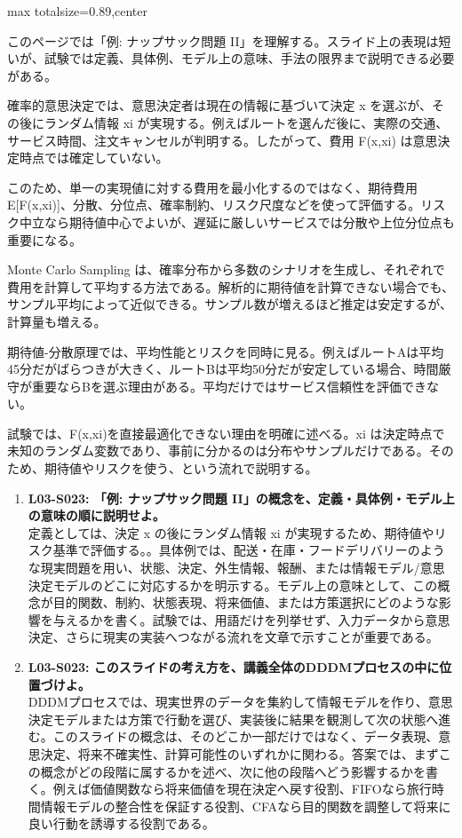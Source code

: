 \begin{minipage}[t]{0.58\textwidth}
\begin{adjustbox}{max totalsize={\textwidth}{0.89\textheight},center}
\begin{minipage}{\textwidth}\scriptsize
{}このページでは「例: ナップサック問題 II」を理解する。スライド上の表現は短いが、試験では定義、具体例、モデル上の意味、手法の限界まで説明できる必要がある。\par
確率的意思決定では、意思決定者は現在の情報に基づいて決定 x を選ぶが、その後にランダム情報 xi が実現する。例えばルートを選んだ後に、実際の交通、サービス時間、注文キャンセルが判明する。したがって、費用 F(x,xi) は意思決定時点では確定していない。\par
このため、単一の実現値に対する費用を最小化するのではなく、期待費用 E[F(x,xi)]、分散、分位点、確率制約、リスク尺度などを使って評価する。リスク中立なら期待値中心でよいが、遅延に厳しいサービスでは分散や上位分位点も重要になる。\par
Monte Carlo Sampling は、確率分布から多数のシナリオを生成し、それぞれで費用を計算して平均する方法である。解析的に期待値を計算できない場合でも、サンプル平均によって近似できる。サンプル数が増えるほど推定は安定するが、計算量も増える。\par
期待値-分散原理では、平均性能とリスクを同時に見る。例えばルートAは平均45分だがばらつきが大きく、ルートBは平均50分だが安定している場合、時間厳守が重要ならBを選ぶ理由がある。平均だけではサービス信頼性を評価できない。\par
試験では、F(x,xi)を直接最適化できない理由を明確に述べる。xi は決定時点で未知のランダム変数であり、事前に分かるのは分布やサンプルだけである。そのため、期待値やリスクを使う、という流れで説明する。\par{}\begin{enumerate}\item \textbf{L03-S023: 「例: ナップサック問題 II」の概念を、定義・具体例・モデル上の意味の順に説明せよ。}\\定義としては、決定 x の後にランダム情報 xi が実現するため、期待値やリスク基準で評価する。。具体例では、配送・在庫・フードデリバリーのような現実問題を用い、状態、決定、外生情報、報酬、または情報モデル/意思決定モデルのどこに対応するかを明示する。モデル上の意味として、この概念が目的関数、制約、状態表現、将来価値、または方策選択にどのような影響を与えるかを書く。試験では、用語だけを列挙せず、入力データから意思決定、さらに現実の実装へつながる流れを文章で示すことが重要である。\item \textbf{L03-S023: このスライドの考え方を、講義全体のDDDMプロセスの中に位置づけよ。}\\DDDMプロセスでは、現実世界のデータを集約して情報モデルを作り、意思決定モデルまたは方策で行動を選び、実装後に結果を観測して次の状態へ進む。このスライドの概念は、そのどこか一部だけではなく、データ表現、意思決定、将来不確実性、計算可能性のいずれかに関わる。答案では、まずこの概念がどの段階に属するかを述べ、次に他の段階へどう影響するかを書く。例えば価値関数なら将来価値を現在決定へ戻す役割、FIFOなら旅行時間情報モデルの整合性を保証する役割、CFAなら目的関数を調整して将来に良い行動を誘導する役割である。\end{enumerate}

\end{minipage}
\end{adjustbox}
\end{minipage}
